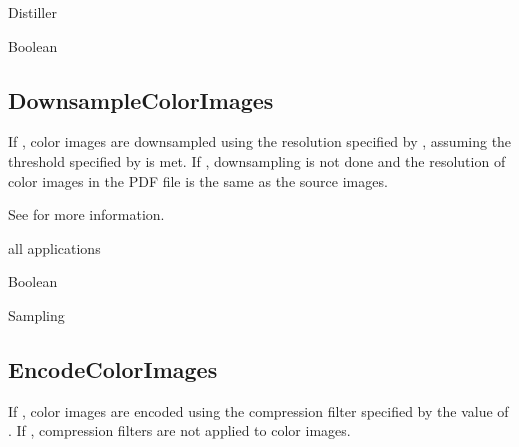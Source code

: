 \documentclass[letterpaper,12pt,english,openany,oneside]{sphinxmanual}
\begin{document}
Distiller

\label{\detokenize{PDF_Create_CommonSettings:type-31}}

Boolean

\label{\detokenize{PDF_Create_CommonSettings:default-value-28}}

\begin{sphinxVerbatim}[commandchars=\\\{\}]
\end{sphinxVerbatim}




\subsection{DownsampleColorImages}
\label{\detokenize{PDF_Create_CommonSettings:downsamplecolorimages}}
If  , color images are downsampled using the resolution specified by  , assuming the threshold specified by  is met. If  , downsampling is not done and the resolution of color images in the PDF file is the same as the source images.

See  for more information.

\label{\detokenize{PDF_Create_CommonSettings:supported-by-32}}

all applications

\label{\detokenize{PDF_Create_CommonSettings:type-32}}

Boolean

\label{\detokenize{PDF_Create_CommonSettings:ui-name-23}}

Sampling

\label{\detokenize{PDF_Create_CommonSettings:default-value-29}}

\begin{sphinxVerbatim}[commandchars=\\\{\}]
\end{sphinxVerbatim}




\subsection{EncodeColorImages}
\label{\detokenize{PDF_Create_CommonSettings:encodecolorimages}}
If  , color images are encoded using the compression filter specified by the value of  . If  , compression filters are not applied to color images.
\end{document}
